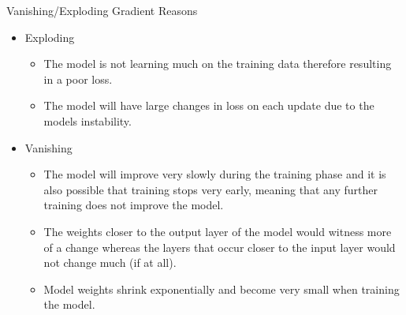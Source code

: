 \begin{frame}{Vanishing/Exploding Gradient Reasons}
    \begin{itemize}
        \item Exploding
        \begin{itemize}
            \item The model is not learning much on the training data therefore resulting in a poor loss.
            \item The model will have large changes in loss on each update due to the models instability.
        \end{itemize}
        \item Vanishing
        \begin{itemize}
            \item The model will improve very slowly during the training phase and it is also possible that training stops very early, meaning that any further training does not improve the model.
            \item The weights closer to the output layer of the model would witness more of a change whereas the layers that occur closer to the input layer would not change much (if at all).
            \item Model weights shrink exponentially and become very small when training the model.
        \end{itemize}
    \end{itemize}
\end{frame}

